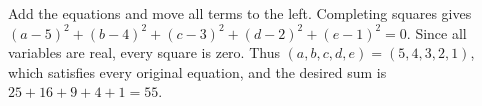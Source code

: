 Add the equations and move all terms to the left. Completing squares gives $(a-5)^2+(b-4)^2+(c-3)^2+(d-2)^2+(e-1)^2=0$. Since all variables are real, every square is zero. Thus $(a,b,c,d,e)=(5,4,3,2,1)$, which satisfies every original equation, and the desired sum is $25+16+9+4+1=\boxed{55}$.
